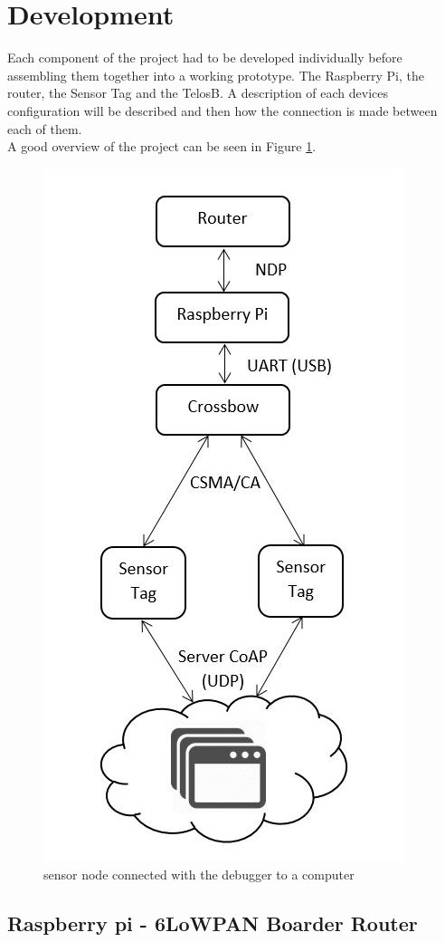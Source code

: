 \section{Development}

Each component of the project had to be developed individually before assembling them together into a working prototype. The Raspberry Pi, the router, the Sensor Tag and the TelosB. A description of each devices configuration will be described and then how the connection is made between each of them.\\

A good overview of the project can be seen in Figure \ref{fig:over}.

\begin{figure}[!h]
	\begin{center}
		\includegraphics[width=0.6\linewidth]{protocol}
		\caption{sensor node connected with the debugger to a computer}
		\label{fig:over}
	\end{center}
\end{figure} 

\subsection{Raspberry pi - 6LoWPAN Boarder Router}

